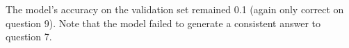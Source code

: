 The model's accuracy on the validation set remained 0.1 (again only correct on question 9).
Note that the model failed to generate a consistent answer to question 7.